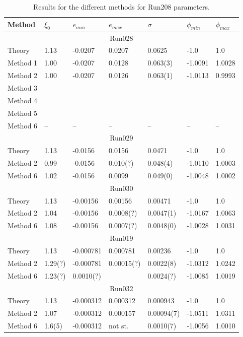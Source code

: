 \begin{table}
\begin{tabular}{lllllll}
\hline
Method & $\xi_0$ & $e_{min}$ & $e_{max}$ & $\sigma$  & $\phi_{min}$
& $\phi_{max}$\\
\hline
\multicolumn{7}{c}{Run028}\\
\hline
Theory   & 1.13 & -0.0207 &  0.0207 & 0.0625 & -1.0 & 1.0 \\
Method 1 & 1.00 & -0.0207 & 0.0128 & 0.063(3) & -1.0091 & 1.0028 \\
Method 2 & 1.00 & -0.0207 & 0.0126 & 0.063(1) & -1.0113 & 0.9993 \\
Method 3 & && & & & \\
Method 4 & && & & & \\
Method 5 & && & & & \\
Method 6 & --& --& --& --& --& --\\
\hline
\multicolumn{7}{c}{Run029}\\
\hline
Theory & 1.13 & -0.0156 & 0.0156 & 0.0471  & -1.0 & 1.0\\
Method 2 & 0.99 & -0.0156 & 0.010(?) & 0.048(4) & -1.0110 & 1.0003\\ 
Method 6 & 1.02 & -0.0156 & 0.0099 & 0.049(0) & -1.0048 & 1.0002\\
\hline
\multicolumn{7}{c}{Run030}\\
\hline
Theory & 1.13 & -0.00156 & 0.00156 & 0.00471 & -1.0 & 1.0\\
Method 2 & 1.04 & -0.00156 & 0.0008(?) & 0.0047(1) & -1.0167 & 1.0063\\
Method 6 & 1.08 & -0.00156 & 0.0007(?) & 0.0048(0) & -1.0028 & 1.0031\\
\hline
\multicolumn{7}{c}{Run019}\\
\hline
Theory & 1.13 & -0.000781 & 0.000781 & 0.00236 & -1.0 & 1.0\\
Method 2 & 1.29(?) & -0.000781 & 0.00015(?) & 0.0022(8) & -1.0312 & 1.0242\\
Method 6 & 1.23(?) & 0.0010(?) &&  0.0024(?) & -1.0085 & 1.0019\\
\hline 
\multicolumn{7}{c}{Run032}\\
\hline
Theory   & 1.13 &  -0.000312 & 0.000312 & 0.000943  & -1.0 &1.0\\
Method 2 & 1.07  & -0.000312& 0.000157 & 0.00094(7) & -1.0511 & 1.0311\\
Method 6 & 1.6(5)& -0.000312 & not st. & 0.0010(7) &-1.0056 & 1.0010\\
\hline
\end{tabular}
\caption{Results for the different methods for Run208 parameters.}
\end{table}

